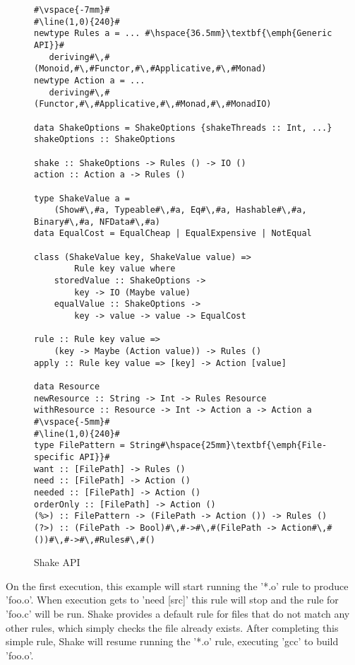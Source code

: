\begin{figure}
\begin{lstlisting}
#\vspace{-7mm}#
#\line(1,0){240}#
newtype Rules a = ... #\hspace{36.5mm}\textbf{\emph{Generic API}}#
   deriving#\,#(Monoid,#\,#Functor,#\,#Applicative,#\,#Monad)
newtype Action a = ...
   deriving#\,#(Functor,#\,#Applicative,#\,#Monad,#\,#MonadIO)

data ShakeOptions = ShakeOptions {shakeThreads :: Int, ...}
shakeOptions :: ShakeOptions

shake :: ShakeOptions -> Rules () -> IO ()
action :: Action a -> Rules ()

type ShakeValue a =
    (Show#\,#a, Typeable#\,#a, Eq#\,#a, Hashable#\,#a, Binary#\,#a, NFData#\,#a)
data EqualCost = EqualCheap | EqualExpensive | NotEqual

class (ShakeValue key, ShakeValue value) =>
        Rule key value where
    storedValue :: ShakeOptions ->
        key -> IO (Maybe value)
    equalValue :: ShakeOptions ->
        key -> value -> value -> EqualCost

rule :: Rule key value =>
    (key -> Maybe (Action value)) -> Rules ()
apply :: Rule key value => [key] -> Action [value]

data Resource
newResource :: String -> Int -> Rules Resource
withResource :: Resource -> Int -> Action a -> Action a
#\vspace{-5mm}#
#\line(1,0){240}#
type FilePattern = String#\hspace{25mm}\textbf{\emph{File-specific API}}#
want :: [FilePath] -> Rules ()
need :: [FilePath] -> Action ()
needed :: [FilePath] -> Action ()
orderOnly :: [FilePath] -> Action ()
(%>) :: FilePattern -> (FilePath -> Action ()) -> Rules ()
(?>) :: (FilePath -> Bool)#\,#->#\,#(FilePath -> Action#\,#())#\,#->#\,#Rules#\,#()
\end{lstlisting}

\caption{Shake API\label{fig:shake-api}}
\end{figure}

On the first execution, this example will start running the \lst'*.o' rule to
produce \lst'foo.o'. When execution gets to \lst'need [src]' this rule will stop
and the rule for \lst'foo.c' will be run. Shake provides a default rule for
files that do not match any other rules, which simply checks the file already
exists. After completing this simple rule, Shake will resume running the
\lst'*.o' rule, executing \lst'gcc' to build \lst'foo.o'.


